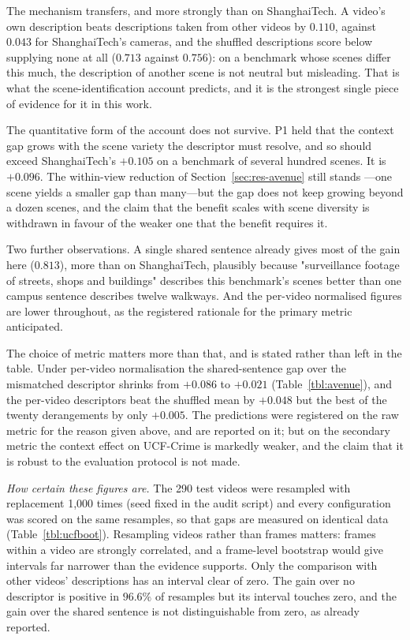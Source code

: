 \documentclass[a4paper,fleqn]{cas-sc}
\begin{document}
The mechanism transfers, and more strongly than on ShanghaiTech. A video's own
description beats descriptions taken from other videos by $0.110$, against
$0.043$ for ShanghaiTech's cameras, and the shuffled descriptions score below
supplying none at all ($0.713$ against $0.756$): on a benchmark whose scenes
differ this much, the description of another scene is not neutral but
misleading. That is what the scene-identification account predicts, and it is
the strongest single piece of evidence for it in this work.

The quantitative form of the account does not survive. P1 held that the context
gap grows with the scene variety the descriptor must resolve, and so should
exceed ShanghaiTech's $+0.105$ on a benchmark of several hundred scenes. It is
$+0.096$. The within-view reduction of Section~\ref{sec:res-avenue} still stands
---one scene yields a smaller gap than many---but the gap does not keep growing
beyond a dozen scenes, and the claim that the benefit scales with scene diversity
is withdrawn in favour of the weaker one that the benefit requires it.

Two further observations. A single shared sentence already gives most of the
gain here ($0.813$), more than on ShanghaiTech, plausibly because "surveillance
footage of streets, shops and buildings" describes this benchmark's scenes better
than one campus sentence describes twelve walkways. And the per-video normalised
figures are lower throughout, as the registered rationale for the primary metric
anticipated.

The choice of metric matters more than that, and is stated rather than left in
the table. Under per-video normalisation the shared-sentence gap over the
mismatched descriptor shrinks from $+0.086$ to $+0.021$
(Table~\ref{tbl:avenue}), and the per-video descriptors beat the shuffled mean by
$+0.048$ but the best of the twenty derangements by only $+0.005$. The
predictions were registered on the raw metric for the reason given above, and
are reported on it; but on the secondary metric the context effect on UCF-Crime
is markedly weaker, and the claim that it is robust to the evaluation protocol
is not made.

\emph{How certain these figures are.} The 290 test videos were resampled with
replacement 1{,}000 times (seed fixed in the audit script) and every
configuration was scored on the same resamples, so that gaps are measured on
identical data (Table~\ref{tbl:ucfboot}). Resampling videos rather than frames
matters: frames within a video are strongly correlated, and a frame-level
bootstrap would give intervals far narrower than the evidence supports. Only the
comparison with other videos' descriptions has an interval clear of zero. The
gain over no descriptor is positive in $96.6\%$ of resamples but its interval
touches zero, and the gain over the shared sentence is not distinguishable from
zero, as already reported.
\end{document}

